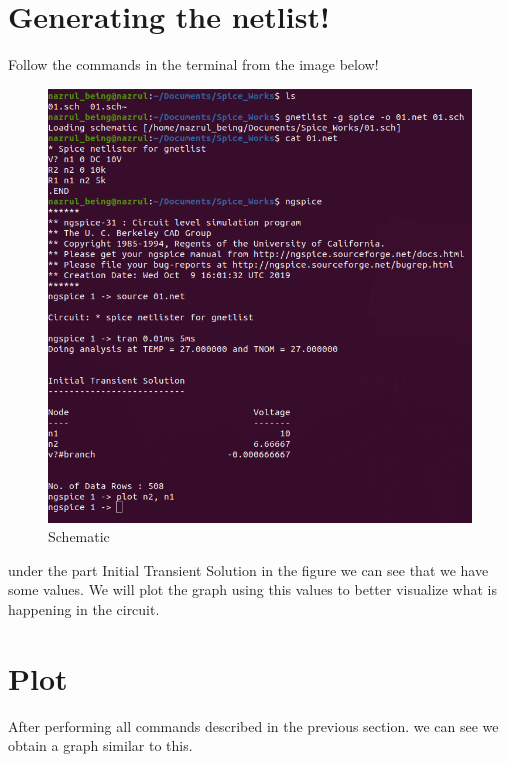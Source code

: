 \documentclass[a4paper,12pt]{article}
\begin{document}
\newpage

\section{Generating the netlist!}
Follow the commands in the terminal from the image below!

\begin{figure}[h!]
\centering
\includegraphics[width=1\textwidth]{Terminal.png}
\caption{Schematic}
\end{figure}

under the part Initial Transient Solution in the figure we can see that we have some values. We will plot the graph using this values to better visualize what is happening in the circuit.


\section{Plot}
After performing all commands described in the previous section. we can see we obtain a graph similar to this.
\end{document}
